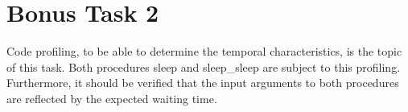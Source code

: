	\section{Bonus Task 2} %
	\label{sec:bonus_task_2}
		Code profiling, to be able to determine the temporal characteristics, is the topic of this task. Both procedures sleep and sleep\_sleep are subject to this profiling. Furthermore, it should be verified that the input arguments to both procedures are reflected by the expected waiting time.

